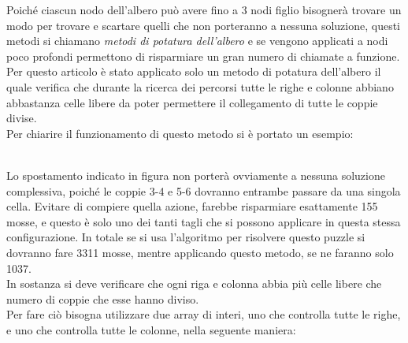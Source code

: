 \documentclass[11pt,a4paper,twocolumn]{IEEEtran}
\newcommand{\mysvg}[2]{}
\newcounter{algoritmo}
\begin{document}
	Poiché ciascun nodo dell'albero può avere fino a 3 nodi figlio bisognerà trovare un modo per trovare e scartare quelli che non porteranno a nessuna soluzione, questi metodi si chiamano \textit{metodi di potatura dell'albero} e se vengono applicati a nodi poco profondi permettono di risparmiare un gran numero di chiamate a funzione.\medskip\\
	Per questo articolo è stato applicato solo un metodo di potatura dell'albero il quale verifica che durante la ricerca dei percorsi tutte le righe e colonne abbiano abbastanza celle libere da poter permettere il collegamento di tutte le coppie divise.\medskip\\
	Per chiarire il funzionamento di questo metodo si è portato un esempio:\\
	\vspace*{-.5cm}
	\begin{figure}[h]
		\centering
		\text{}\hspace*{0.5cm}{\large\mysvg{giacomo}{4}}
	\end{figure}\\
	Lo spostamento indicato in figura non porterà ovviamente a nessuna soluzione complessiva, poiché le coppie 3-4 e 5-6 dovranno entrambe passare da una singola cella. Evitare di compiere quella azione, farebbe risparmiare esattamente 155 mosse, e questo è solo uno dei tanti tagli che si possono applicare in questa stessa configurazione. In totale se si usa l'algoritmo per risolvere questo puzzle si dovranno fare 3311 mosse, mentre applicando questo metodo, se ne faranno solo 1037.\bigskip\\
	In sostanza si deve verificare che ogni riga e colonna abbia più celle libere che numero di coppie che esse hanno diviso.\\
	Per fare ciò bisogna utilizzare due array di interi, uno che controlla tutte le righe, e uno che controlla tutte le colonne, nella seguente maniera:
\end{document}
